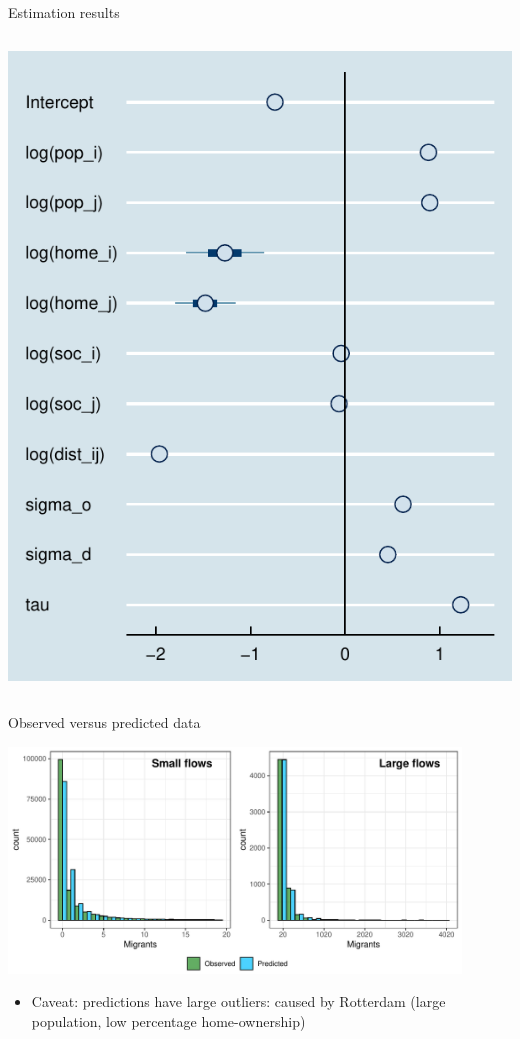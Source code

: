 \documentclass{beamer}
\begin{document}
\begin{frame}{Estimation results}
\begin{columns}
\begin{column}{0.5\textwidth}
			\begin{center}
				\includegraphics[width=\textwidth]{../fig/forestplot}      
			\end{center}
		\end{column}
	\end{columns}
\end{frame}

\begin{frame}{Observed versus predicted data}
\begin{center}
	\includegraphics[width=0.9\textwidth]{../fig/hist_fit}      
\end{center}
\begin{itemize}
	\item \alert{Caveat}: predictions have large outliers: caused by Rotterdam (large population, low percentage home-ownership)
\end{itemize}
\end{frame}
\end{document}
